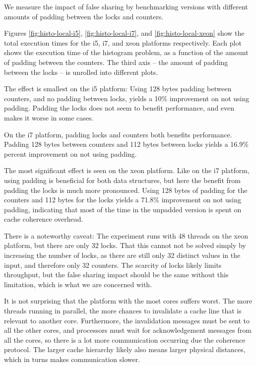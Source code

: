 We measure the impact of false sharing by benchmarking versions with different
amounts of padding between the locks and counters.




Figures \ref{fig:histo-local-i5}, \ref{fig:histo-local-i7}, and
\ref{fig:histo-local-xeon} show the total execution times for the i5, i7, and
xeon platforms respectively. Each plot shows the execution time of the
histogram problem, as a function of the amount of padding between the counters.
The third axis -- the amount of padding between the locks -- is unrolled into
different plots.

The effect is smallest on the i5 platform: Using 128 bytes padding between
counters, and no padding between locks, yields a 10\% improvement on not using
padding. Padding the locks does not seem to benefit performance, and even makes
it worse in some cases.

On the i7 platform, padding locks and counters both benefits performance.
Padding 128 bytes between counters and 112 bytes between locks yields a 16.9\%
percent improvement on not using padding.

The most significant effect is seen on the xeon platform. Like on the i7
platform, using padding is beneficial for both data structures, but here the
benefit from padding the locks is much more pronounced. Using 128 bytes of
padding for the counters and 112 bytes for the locks yields a 71.8\% improvement
on not using padding, indicating that most of the time in the unpadded version
is spent on cache coherence overhead.

There is a noteworthy caveat: The experiment runs with 48 threads on the xeon
platform, but there are only 32 locks.
That this cannot not be solved simply by increasing the
number of locks, as there are still only 32 distinct values in the input, and
therefore only 32 counters.
The scarcity of locks likely limits
throughput, but the false sharing impact should be the same without
this limitation, which is what we are concerned with.

It is not surprising that the platform with the most cores suffers worst. The
more threads running in parallel, the more chances to invalidate a cache line
that is relevant to another core. Furthermore, the invalidation messages must be
sent to all the other cores, and processors must wait for acknowledgement
messages from all the cores, so there is a lot more communication occurring due
the coherence protocol. The larger cache hierarchy likely also means larger
physical distances, which in turns makes communication slower.

